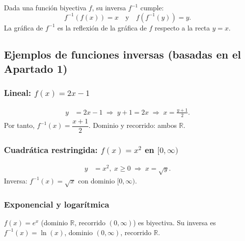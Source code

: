 \documentclass[12pt,a4paper]{article}
\begin{document}
Dada una función biyectiva $f$, su inversa $f^{-1}$ cumple:
\[
f^{-1}(f(x)) = x \quad \text{y} \quad f(f^{-1}(y)) = y.
\]
La gráfica de $f^{-1}$ es la reflexión de la gráfica de $f$ respecto a la recta $y=x$.

\subsection{Ejemplos de funciones inversas (basadas en el Apartado 1)}

\subsubsection{Lineal: $f(x)=2x-1$}
\begin{align*}
    y &= 2x-1 \;\Rightarrow\; y+1 = 2x \;\Rightarrow\; x = \frac{y+1}{2}.
\end{align*}
Por tanto, $f^{-1}(x)=\dfrac{x+1}{2}$. Dominio y recorrido: ambos $\mathbb{R}$.

\begin{center}
\end{center}

\subsubsection{Cuadrática restringida: $f(x)=x^2$ en $[0,\infty)$}
\begin{align*}
    y &= x^2,\; x\geq 0 \;\Rightarrow\; x = \sqrt{y}.
\end{align*}
Inversa: $f^{-1}(x)=\sqrt{x}$ con dominio $[0,\infty)$.

\subsubsection{Exponencial y logarítmica}
$f(x)=e^x$ (dominio $\mathbb{R}$, recorrido $(0,\infty)$) es biyectiva. Su inversa es $f^{-1}(x)=\ln(x)$, dominio $(0,\infty)$, recorrido $\mathbb{R}$.
\end{document}
